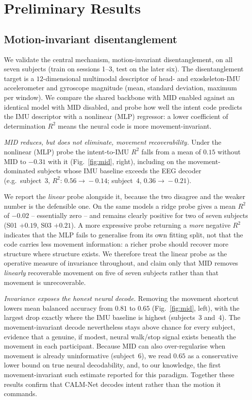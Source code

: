 \documentclass[journal]{IEEEtran}
\begin{document}
\section{Preliminary Results}\label{sec:valid}
\subsection{Motion-invariant disentanglement}
We validate the central mechanism, motion-invariant disentanglement, on all seven
subjects (train on sessions 1--3, test on the later six). The disentanglement
target is a $12$-dimensional multimodal descriptor of head- and exoskeleton-IMU
accelerometer and gyroscope magnitude (mean, standard deviation, maximum per
window). We compare the shared backbone with MID enabled against an identical model
with MID disabled, and probe how well the intent code predicts the IMU descriptor
with a nonlinear (MLP) regressor: a lower coefficient of determination $R^2$ means
the neural code is more movement-invariant.

\emph{MID reduces, but does not eliminate, movement recoverability.} Under the
nonlinear (MLP) probe the intent-to-IMU $R^2$ falls from a mean of $0.15$ without MID
to $-0.31$ with it (Fig.~\ref{fig:mid}, right), including on the movement-dominated
subjects whose IMU baseline exceeds the EEG decoder (e.g.\ subject~3,
$R^2\!:\,0.56\!\rightarrow\!-0.14$; subject~4, $0.36\!\rightarrow\!-0.21$).

We report the \emph{linear} probe alongside it, because the two disagree and the
weaker number is the defensible one. On the same models a ridge probe gives a mean
$R^2$ of $-0.02$ -- essentially zero -- and remains clearly positive for two of seven
subjects (S01 $+0.19$, S03 $+0.21$). A more expressive probe returning a
\emph{more} negative $R^2$ indicates that the MLP fails to generalise from its own
fitting split, not that the code carries less movement information: a richer probe
should recover more structure where structure exists. We therefore treat the linear
probe as the operative measure of invariance throughout, and claim only that MID
removes \emph{linearly} recoverable movement on five of seven subjects rather than
that movement is unrecoverable.

\emph{Invariance exposes the honest neural decode.} Removing the movement shortcut
lowers mean balanced accuracy from $0.81$ to $0.65$ (Fig.~\ref{fig:mid}, left), with
the largest drop exactly where the IMU baseline is highest (subjects~3 and~4). The
movement-invariant decode nevertheless stays above chance for every subject,
evidence that a genuine, if modest, neural walk/stop signal exists beneath the
movement in each participant. Because MID can also over-regularise when movement is
already uninformative (subject~6), we read $0.65$ as a conservative lower bound on
true neural decodability, and, to our knowledge, the first movement-invariant such
estimate reported for this paradigm. Together these results confirm that CALM-Net
decodes intent rather than the motion it commands.
\end{document}
